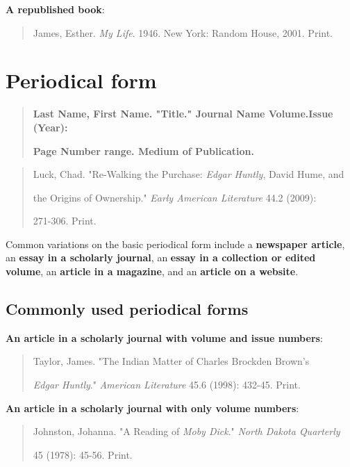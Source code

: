 \textbf{A republished book}: 
\begin{quote}
James, Esther. \emph{My Life}. 1946. New York: Random House, 2001. Print.
\end{quote}


\section{Periodical form}
\begin{quote}
\textbf{Last Name, First Name. "Title." Journal Name Volume.Issue  (Year):}

\hspace{.4in}\textbf{Page Number range. Medium of Publication.}
\end{quote}

\begin{quote}
Luck, Chad. "Re-Walking the Purchase: \emph{Edgar Huntly}, David Hume, and

\hspace{.4in}the Origins of Ownership." \emph{Early American Literature} 44.2 (2009):  

\hspace{.4in}271-306. Print.
\end{quote}

Common variations on the basic periodical form include a \textbf{newspaper article}, 
an \textbf{essay in a scholarly journal}, an \textbf{essay in a collection or edited volume}, 
an \textbf{article in a magazine}, and an \textbf{article on a website}.

\subsection{Commonly used periodical forms}

\textbf{An article in a scholarly journal with volume and issue numbers}:
\begin{quote}
Taylor, James. "The Indian Matter of Charles Brockden Brown's

\hspace{.4in}\emph{Edgar Huntly}." \emph{American Literature} 45.6 (1998): 432-45. Print.
\end{quote}


\textbf{An article in a scholarly journal with only volume numbers}:
\begin{quote}
Johnston, Johanna. "A Reading of \emph{Moby Dick}." \emph{North Dakota Quarterly}  

\hspace{.4in}45 (1978): 45-56. Print.
\end{quote}

